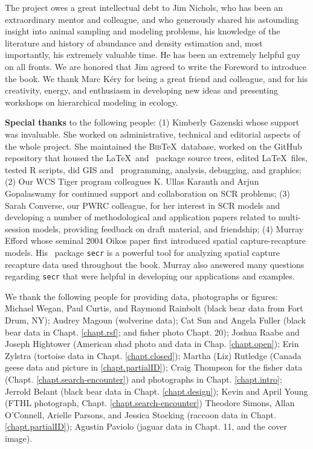 
The project owes a great intellectual debt to Jim Nichols, who has
been an extraordinary mentor and colleague,
and who generously shared his
astounding insight into animal sampling and modeling problems, his
knowledge
of the literature and history of abundance and density estimation
and, most importantly, his extremely valuable time.
He has
been
an 
extremely helpful guy on all fronts. We are honored that Jim
agreed to write the Foreword to introduce the book. 
 We thank Marc K\'{e}ry
for being a great friend and colleague, and for his creativity, 
energy, and enthusiasm in developing new ideas and
presenting workshops on hierarchical modeling in ecology.

{\bf Special thanks} to the following people: (1) Kimberly Gazenski whose support was
invaluable. She worked on administrative, technical and editorial
aspects of the whole project. She maintained the \textsc{Bib}\TeX~database,
worked on the GitHub repository that housed the \LaTeX~and \R~package
source trees, edited \LaTeX~files, tested R scripts, did GIS and
\R~programming, analysis, debugging, and graphics;  (2) Our WCS Tiger
program colleagues K. Ullas Karanth and Arjun Gopalaswamy for
continued support and collaboration on SCR problems;  (3) Sarah
Converse, our PWRC colleague, for her interest in SCR models and
developing a number of methodological and application papers related
to multi-session models, providing feedback on draft material, and
friendship;  (4) Murray Efford whose seminal 2004 Oikos paper first introduced spatial
capture-recapture models.  His \R~package \mbox{\tt secr} 
is a powerful tool for analyzing
spatial capture recapture data used
throughout the book. Murray also answered many questions regarding \mbox{\tt secr} that 
were helpful in developing our applications and examples.

We thank the following people for providing data, photographs or figures:
Michael Wegan, Paul Curtis, and Raymond Rainbolt (black bear data from Fort Drum, NY);
Audrey Magoun (wolverine data); Cat Sun and Angela Fuller (black bear
data in Chapt. \ref{chapt.rsf}; and fisher photo Chapt. 20); Joshua Raabe and Joseph Hightower (American shad
photo and data in Chap. \ref{chapt.open}); Erin Zylstra (tortoise
data in Chapt. \ref{chapt.closed}); Martha (Liz) Rutledge (Canada geese
data and picture in \ref{chapt.partialID});  Craig Thompson for the
fisher data (Chapt. \ref{chapt.search-encounter}) and photographs in
Chapt. \ref{chapt.intro};
Jerrold Belant (black bear data
in Chapt. \ref{chapt.design}); Kevin and April Young (FTHL photograph,
Chapt. \ref{chapt.search-encounter}) Theodore Simons, Allan O'Connell,
Arielle Parsons, and Jessica Stocking (raccoon data in Chapt.
\ref{chapt.partialID}); Agustin Paviolo (jaguar data in Chapt. 11, and
the cover image).

